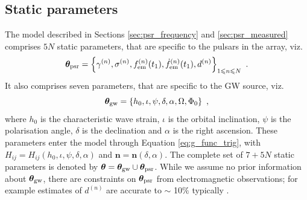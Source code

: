 \documentclass[fleqn,usenatbib,useAMS]{mnras}
\begin{document}
\subsection{Static parameters}\label{sec:ss_params}
The model described in Sections \ref{sec:psr_frequency} and \ref{sec:psr_measured} comprises $5N$ static parameters, that are specific to the pulsars in the array, viz.
\begin{equation}
	\boldsymbol{\theta}_{\rm psr} = \left \{ \gamma^{(n)},\sigma^{(n)}, f_{\rm em}^{(n)}(t_1),\dot{f}_{\rm em}^{(n)}(t_1),d^{(n)}\right\}_{1\leq n \leq N} \ .  \label{eq:psrparams}
\end{equation}
It also comprises seven parameters, that are specific to the GW source, viz. 
\begin{equation}
	\boldsymbol{\theta}_{\rm gw} = \left \{h_0, \iota, \psi, \delta, \alpha, \Omega, \Phi_0 \right \} \ ,  \label{eq:params3}
\end{equation}
where $h_0$ is the characteristic wave strain, $\iota$ is the orbital inclination, $\psi$ is the polarisation angle, $\delta$ is the declination and $\alpha$ is the right ascension. These parameters enter the model through Equation \eqref{eq:g_func_trig}, with $H_{ij} = H_{ij}(h_0, \iota, \psi, \delta, \alpha)$ and $\boldsymbol{n}=\boldsymbol{n}(\delta,\alpha)$. The complete set of $7 + 5N$ static parameters is denoted by $\boldsymbol{\theta} = \boldsymbol{\theta}_{\rm gw} \cup \boldsymbol{\theta}_{\rm psr}$. While we assume no prior information about $\boldsymbol{\theta}_{\rm gw}$, there are constraints on $\boldsymbol{\theta}_{\rm psr}$ from electromagnetic observations; for example estimates of $d^{(n)}$ are accurate to $\sim$ 10$\%$ typically \citep{Cordes2002astro.ph..7156C, Verbiest2012ApJ...755...39V, Desvignes2016,Yao2017}.
\end{document}
